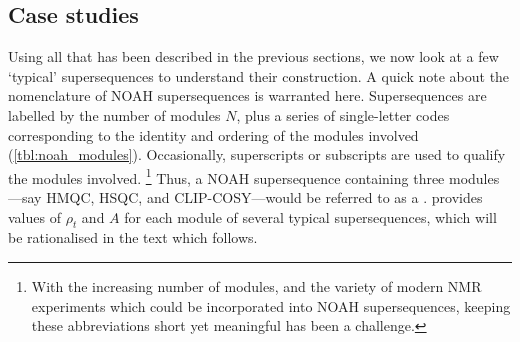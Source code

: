 \subsection{Case studies}
\label{subsec:noah__case_studies}

Using all that has been described in the previous sections, we now look at a few `typical' supersequences to understand their construction.
A quick note about the nomenclature of NOAH supersequences is warranted here.
Supersequences are labelled by the number of modules $N$, plus a series of single-letter codes corresponding to the identity and ordering of the modules involved (\cref{tbl:noah_modules}).
Occasionally, superscripts or subscripts are used to qualify the modules involved.%
\footnote{With the increasing number of modules, and the variety of modern NMR experiments which could be incorporated into NOAH supersequences, keeping these abbreviations short yet meaningful has been a challenge.}
Thus, a NOAH supersequence containing three modules---say \nitrogen{} HMQC, \carbon{} HSQC, and CLIP-COSY---would be referred to as a .
 provides values of $\rho_t$ and $A$ for each module of several typical supersequences, which will be rationalised in the text which follows.

